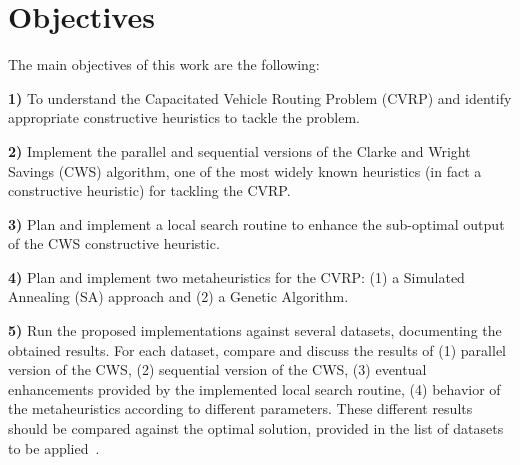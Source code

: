 \section{Objectives}
\label{sec:objectives}

The main objectives of this work are the following:\vertbreak

\textbf{1)} To understand the Capacitated Vehicle Routing Problem (CVRP) and 
            identify appropriate constructive heuristics to tackle the 
            problem.\vertbreak

\textbf{2)} Implement the parallel and sequential versions of the Clarke and 
            Wright Savings (CWS) algorithm, one of the most widely known heuristics 
            (in fact a constructive heuristic) for tackling the CVRP.\vertbreak

\textbf{3)} Plan and implement a local search routine to enhance the sub-optimal 
            output of the CWS constructive heuristic.\vertbreak

\textbf{4)} Plan and implement two metaheuristics for the CVRP: (1) a Simulated 
            Annealing (SA) approach and (2) a Genetic Algorithm.\vertbreak

\textbf{5)} Run the proposed implementations against several datasets, 
            documenting the obtained results. For each dataset, compare and discuss the 
            results of (1) parallel version of the CWS, (2) sequential version 
            of the CWS, (3) eventual enhancements provided by the implemented 
            local search routine, (4) behavior of the metaheuristics according to 
            different parameters. These different results should be 
            compared against the optimal solution, provided in the list of 
            datasets to be applied~\cite{website:cvrp-datasets}.\vertbreak

